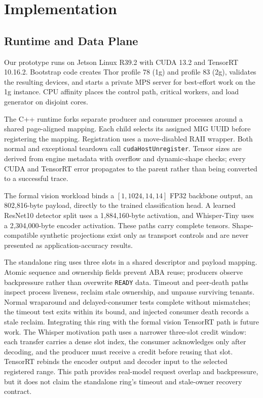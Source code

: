 \section{Implementation}
\label{sec:implementation}

\subsection{Runtime and Data Plane}

Our prototype runs on Jetson Linux R39.2 with CUDA 13.2 and TensorRT 10.16.2.
Bootstrap code creates Thor profile 78 (1g) and profile 83 (2g), validates the
resulting devices, and starts a private MPS server for best-effort work on the
1g instance.  CPU affinity places the control path, critical workers, and load
generator on disjoint cores.

The C++ runtime forks separate producer and consumer processes around a shared
page-aligned mapping.  Each child selects its assigned MIG UUID before
registering the mapping.  Registration uses a move-disabled RAII wrapper.
Both normal and exceptional teardown call
\texttt{cudaHostUnregister}.
Tensor sizes are derived from engine metadata with overflow and dynamic-shape
checks; every CUDA and TensorRT error propagates to the parent rather than
being converted to a successful trace.

The formal vision workload binds a $[1,1024,14,14]$ FP32 backbone output, an
802,816-byte payload, directly to the trained classification head.  A learned
ResNet10 detector split uses a 1,884,160-byte activation, and Whisper-Tiny uses
a 2,304,000-byte encoder activation.  These paths carry complete tensors.
Shape-compatible synthetic projections exist only as transport controls and
are never presented as application-accuracy results.

The standalone ring uses three slots in a shared descriptor and payload
mapping.  Atomic sequence and ownership fields prevent ABA reuse; producers
observe backpressure rather than overwrite \texttt{READY} data.  Timeout and
peer-death paths inspect process liveness, reclaim stale ownership, and unpause
surviving tenants.  Normal wraparound and delayed-consumer tests complete
without mismatches; the timeout test exits within its bound, and injected
consumer death records a stale reclaim.  Integrating this ring with the
formal vision TensorRT path is future work.  The Whisper motivation path uses
a narrower three-slot credit window: each transfer carries a dense slot index,
the consumer acknowledges only after decoding, and the producer must receive a
credit before reusing that slot.  TensorRT rebinds the encoder output and
decoder input to the selected registered range.  This path provides real-model
request overlap and backpressure, but it does not claim the standalone ring's
timeout and stale-owner recovery contract.

